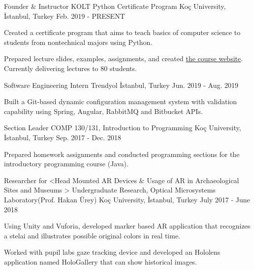 
\vspace*{-1.5mm}
\begin{cventries}

  \cventry
    {Founder \& Instructor}
    {KOLT Python Certificate Program}
    {Koç University, İstanbul, Turkey}
    {Feb. 2019 - PRESENT}
    {
      \begin{cvitems}
        \item {Created a certificate program that aims to teach basics of computer science to students from nontechnical majors using Python.}
        \item {Prepared lecture slides, examples, assignments, and created \href{https://koltpython.github.io}{the course website}. Currently delivering lectures to 80 students.}
      \end{cvitems}
    }

  \cventry
    {Software Engineering Intern}
    {Trendyol}
    {İstanbul, Turkey}
    {Jun. 2019 - Aug. 2019}
    {
      \begin{cvitems}
        \item {Built a Git-based dynamic configuration management system with validation capability using Spring, Angular, RabbitMQ and Bitbucket APIs.}
      \end{cvitems}
    }

  \cventry
    {Section Leader}%
    {COMP 130/131, Introduction to Programming}%
    {Koç University, İstanbul, Turkey}
    {Sep. 2017 - Dec. 2018}
    {
      \begin{cvitems}
        \item {Prepared homework assignments and conducted programming sections for the introductory programming course (Java).}
      \end{cvitems}
    }


  \cventry
    {Researcher for <Head Mounted AR Devices \& Usage of AR in Archaeological Sites and Museums >}%
     {Undergraduate Research, Optical Microsystems Laboratory(Prof. Hakan Ürey)}%
    {Koç University, İstanbul, Turkey}
    {July 2017 - June 2018}
    {
      \begin{cvitems} 
        \item {Using Unity and Vuforia, developed marker based AR application that recognizes a stelai and illustrates possible original colors in real time.}
	      \item {Worked with pupil labs gaze tracking device and developed an Hololens application named HoloGallery that can show historical images.}
      \end{cvitems} 
    }

\end{cventries}
